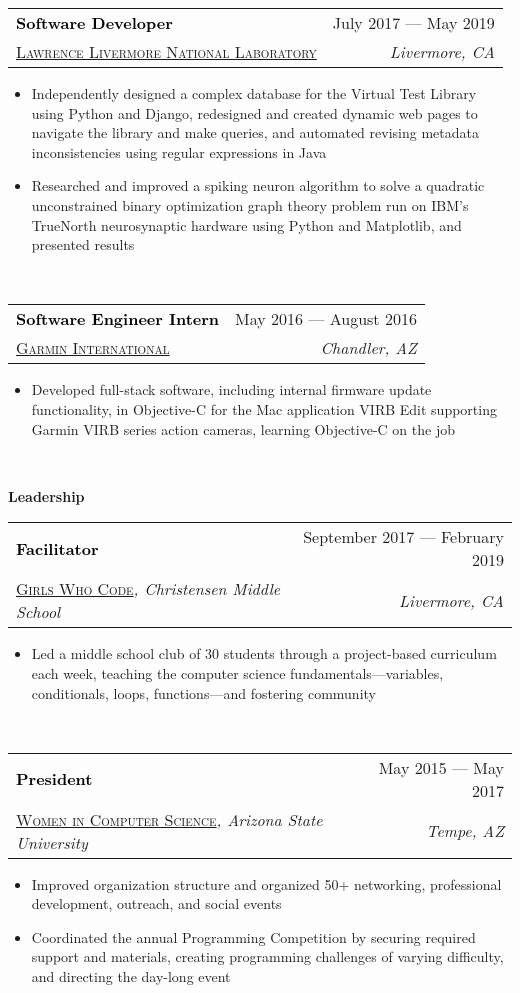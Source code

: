 \documentclass[letterpaper,11pt]{article}
\makeatletter
\newcommand{\resumeSpacing}{5pt}
\newcommand{\resumeSection}[1]{
  {\LARGE
  \textcolor{accent}{\textbf{#1}}
  \hrulefill}
  \vspace{\resumeSpacing}
}
\newcommand{\resumeSubsection}[6]{
  \vspace{\resumeSpacing}
	\begin{tabular*}{\textwidth}{l@{\extracolsep{\fill}}r}
	\large\textcolor{black}{\textbf{#1}} & \small\textcolor{accent}{#2} \\
  \href{#4}{\textsc{#3}}\textit{#6} & \textit{#5} \\
	\end{tabular*}
}
\newenvironment{resumeItemize}{
  \addtolength{\leftmargini}{-\resumeSpacing}
  \begin{minipage}{0.99\textwidth}
  \begin{itemize}
  \small
}{
  \end{itemize}
  \vspace{0pt}
  \end{minipage}
  \normalsize
  \ \\
}
\newcommand{\resumeItem}[1]
{
  \item{#1}
  \vspace{-\resumeSpacing}
}
\makeatother
\begin{document}
  \resumeSubsection
  {Software Developer}{July 2017 --- May 2019}
  {Lawrence Livermore National Laboratory}{https://www.llnl.gov/}{Livermore, CA}{}
  \begin{resumeItemize}
	  \resumeItem
    {Independently designed a complex database for the Virtual Test Library using Python and Django, redesigned and created dynamic web pages to navigate the library and make queries, and automated revising metadata inconsistencies using regular expressions in Java}
	  \resumeItem
	  {Researched and improved a spiking neuron algorithm to solve a quadratic unconstrained binary optimization graph theory problem run on IBM's TrueNorth neurosynaptic hardware using Python and Matplotlib, and presented results}
  \end{resumeItemize}
	\resumeSubsection
  {Software Engineer Intern}{May 2016 --- August 2016}
  {Garmin International}{https://www.garmin.com/}{Chandler, AZ}{}
	\begin{resumeItemize}
	\resumeItem
	{Developed full-stack software, including internal firmware update functionality, in Objective-C for the Mac application VIRB Edit supporting Garmin VIRB series action cameras, learning Objective-C on the job}
	\end{resumeItemize}
  \resumeSection{Leadership}
  \resumeSubsection
  {Facilitator}{September 2017 --- February 2019}
  {Girls Who Code}{https://girlswhocode.com/}{Livermore, CA}{, Christensen Middle School}
  \begin{resumeItemize}
  \resumeItem
    {Led a middle school club of 30 students through a project-based curriculum each week, teaching the computer science fundamentals---variables, conditionals, loops, functions---and fostering community}
  \end{resumeItemize}
  \resumeSubsection
  {President}{May 2015 --- May 2017}
  {Women in Computer Science}{http://wics-asu.org/}{Tempe, AZ}{, Arizona State University}
  \begin{resumeItemize}
	  \resumeItem
    {Improved organization structure and organized 50+ networking, professional development, outreach, and social events}
	  \resumeItem
    {Coordinated the annual Programming Competition by securing required support and materials, creating programming challenges of varying difficulty, and directing the day-long event}
  \end{resumeItemize}
\end{document}
